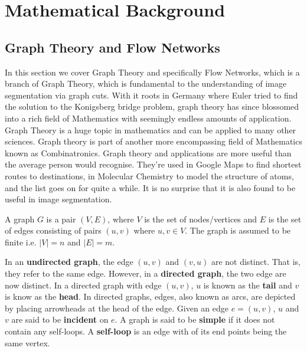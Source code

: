 
\chapter{Mathematical Background} %

\label{chap:Chapter2} %


\section{Graph Theory and Flow Networks}
\label{sec:GraphTheory}

In this section we cover Graph Theory and specifically Flow Networks, which is a branch of Graph Theory, which is fundamental to the understanding of image segmentation via graph cuts. With it roots in Germany where Euler tried to find the solution to the Konigsberg bridge problem, graph theory has since blossomed into a rich field of Mathematics with seemingly endless amounts of application. Graph Theory is a huge topic in mathematics and can be applied to many other sciences. Graph theory is part of another more encompassing field of Mathematics known as Combinatronics. Graph theory and applications are more useful than the average person would recognise. They're used in Google Maps to find shortest routes to destinations, in Molecular Chemistry to model the structure of atoms, and the list goes on for quite a while. It is no surprise that it is also found to be useful in image segmentation.

\begin{definition}[Graph]\label{def_graph}
	A graph $G$ is a pair $(V,E)$, where $V$ is the set of nodes/vertices and $E$ is the set of edges consisting of pairs $(u,v)$ where $u,v \in V$. The graph is assumed to be finite i.e. $|V| = n$ and $|E| = m$.
\end{definition}

In an \textbf{undirected graph}, the edge $(u,v)$ and $(v,u)$ are not distinct. That is, they refer to the same edge. However, in a \textbf{directed graph}, the two edge are now distinct. In a directed graph with edge $(u,v)$, $u$ is known as the \textbf{tail} and $v$ is know as the \textbf{head}. In directed graphs, edges, also known as arcs, are depicted by placing arrowheads at the head of the edge. Given an edge $e = (u,v)$, $u$ and $v$ are said to be \textbf{incident} on $e$. A graph is said to be \textbf{simple} if it does not contain any self-loops. A \textbf{self-loop} is an edge with of its end points being the same vertex.

